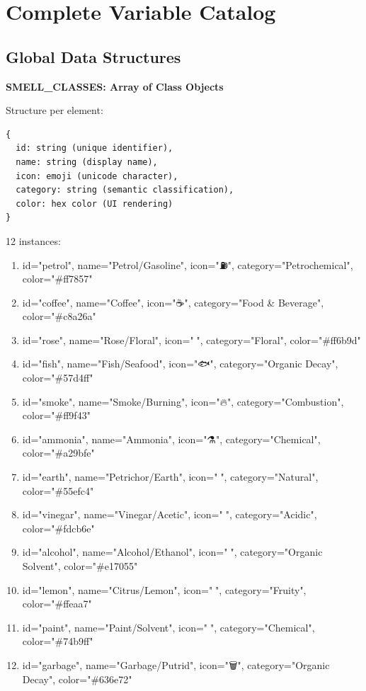 \documentclass[12pt,a4paper]{article}
\begin{document}
\section{Complete Variable Catalog}

\subsection{Global Data Structures}

\textbf{SMELL\_CLASSES: Array of Class Objects}

Structure per element:
\begin{verbatim}
{
  id: string (unique identifier),
  name: string (display name),
  icon: emoji (unicode character),
  category: string (semantic classification),
  color: hex color (UI rendering)
}
\end{verbatim}

12 instances:
\begin{enumerate}
    \item id="petrol", name="Petrol/Gasoline", icon="⛽", category="Petrochemical", color="\#ff7857"
    \item id="coffee", name="Coffee", icon="☕", category="Food \& Beverage", color="\#c8a26a"
    \item id="rose", name="Rose/Floral", icon="🌹", category="Floral", color="\#ff6b9d"
    \item id="fish", name="Fish/Seafood", icon="🐟", category="Organic Decay", color="\#57d4ff"
    \item id="smoke", name="Smoke/Burning", icon="🔥", category="Combustion", color="\#ff9f43"
    \item id="ammonia", name="Ammonia", icon="⚗️", category="Chemical", color="\#a29bfe"
    \item id="earth", name="Petrichor/Earth", icon="🌱", category="Natural", color="\#55efc4"
    \item id="vinegar", name="Vinegar/Acetic", icon="🍶", category="Acidic", color="\#fdcb6e"
    \item id="alcohol", name="Alcohol/Ethanol", icon="🍷", category="Organic Solvent", color="\#e17055"
    \item id="lemon", name="Citrus/Lemon", icon="🍋", category="Fruity", color="\#ffeaa7"
    \item id="paint", name="Paint/Solvent", icon="🎨", category="Chemical", color="\#74b9ff"
    \item id="garbage", name="Garbage/Putrid", icon="🗑️", category="Organic Decay", color="\#636e72"
\end{enumerate}
\end{document}

